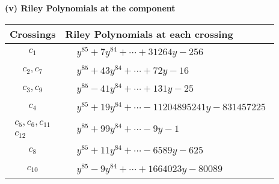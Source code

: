 \documentclass[1p]{elsarticle_modified}
\theoremstyle{definition}
\begin{document}
\newpage\renewcommand{\arraystretch}{1}
\flushleft \textbf{(v) Riley Polynomials at the component}\newline \\
\begin{tabular}{m{50pt}|m{274pt}}
Crossings & \hspace{64pt}Riley Polynomials at each crossing \\
\hline $$\begin{aligned}c_{1}\end{aligned}$$&$\begin{aligned}
&y^{85}+7 y^{84}+\cdots+31264 y-256
\end{aligned}$\\
\hline $$\begin{aligned}c_{2},c_{7}\end{aligned}$$&$\begin{aligned}
&y^{85}+43 y^{84}+\cdots+72 y-16
\end{aligned}$\\
\hline $$\begin{aligned}c_{3},c_{9}\end{aligned}$$&$\begin{aligned}
&y^{85}-41 y^{84}+\cdots+131 y-25
\end{aligned}$\\
\hline $$\begin{aligned}c_{4}\end{aligned}$$&$\begin{aligned}
&y^{85}+19 y^{84}+\cdots-11204895241 y-831457225
\end{aligned}$\\
\hline $$\begin{aligned}c_{5},c_{6},c_{11}\\c_{12}\end{aligned}$$&$\begin{aligned}
&y^{85}+99 y^{84}+\cdots-9 y-1
\end{aligned}$\\
\hline $$\begin{aligned}c_{8}\end{aligned}$$&$\begin{aligned}
&y^{85}+11 y^{84}+\cdots-6589 y-625
\end{aligned}$\\
\hline $$\begin{aligned}c_{10}\end{aligned}$$&$\begin{aligned}
&y^{85}-9 y^{84}+\cdots+1664023 y-80089
\end{aligned}$\\
\hline
\end{tabular}\\~\\
\end{document}
